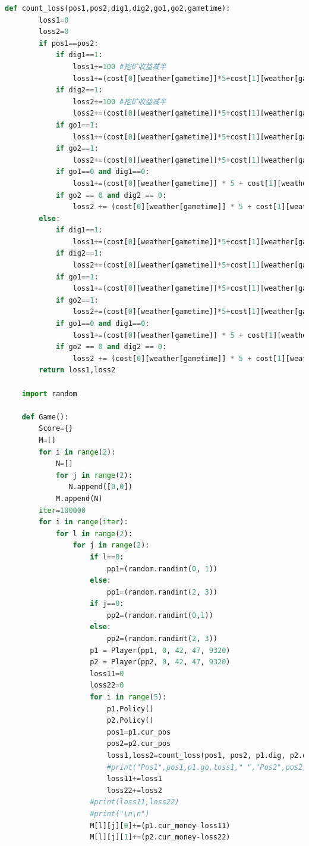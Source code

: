 \documentclass[withoutpreface,bwprint]{cumcmthesis} %
\begin{document}
\begin{appendices}
\begin{lstlisting}[language=python]
    def count_loss(pos1,pos2,dig1,dig2,go1,go2,gametime):
        loss1=0
        loss2=0
        if pos1==pos2:
            if dig1==1:
                loss1+=100 #挖矿收益减半
                loss1+=(cost[0][weather[gametime]]*5+cost[1][weather[gametime]]*10)*3
            if dig2==1:
                loss2+=100 #挖矿收益减半
                loss2+=(cost[0][weather[gametime]]*5+cost[1][weather[gametime]]*10)*3
            if go1==1:
                loss1+=(cost[0][weather[gametime]]*5+cost[1][weather[gametime]]*10)*4
            if go2==1:
                loss2+=(cost[0][weather[gametime]]*5+cost[1][weather[gametime]]*10)*4
            if go1==0 and dig1==0:
                loss1+=(cost[0][weather[gametime]] * 5 + cost[1][weather[gametime]] * 10) * 2
            if go2 == 0 and dig2 == 0:
                loss2 += (cost[0][weather[gametime]] * 5 + cost[1][weather[gametime]] * 10) * 2
        else:
            if dig1==1:
                loss1+=(cost[0][weather[gametime]]*5+cost[1][weather[gametime]]*10)*3
            if dig2==1:
                loss2+=(cost[0][weather[gametime]]*5+cost[1][weather[gametime]]*10)*3
            if go1==1:
                loss1+=(cost[0][weather[gametime]]*5+cost[1][weather[gametime]]*10)*2
            if go2==1:
                loss2+=(cost[0][weather[gametime]]*5+cost[1][weather[gametime]]*10)*2
            if go1==0 and dig1==0:
                loss1+=(cost[0][weather[gametime]] * 5 + cost[1][weather[gametime]] * 10)
            if go2 == 0 and dig2 == 0:
                loss2 += (cost[0][weather[gametime]] * 5 + cost[1][weather[gametime]] * 10)
        return loss1,loss2
    
    import random
    
    def Game():
        Score={}
        M=[]
        for i in range(2):
            N=[]
            for j in range(2):
               N.append([0,0])
            M.append(N)
        iter=100000
        for i in range(iter):
            for l in range(2):
                for j in range(2):
                    if l==0:
                        pp1=(random.randint(0, 1))
                    else:
                        pp1=(random.randint(2, 3))
                    if j==0:
                        pp2=(random.randint(0,1))
                    else:
                        pp2=(random.randint(2, 3))
                    p1 = Player(pp1, 0, 42, 47, 9320)
                    p2 = Player(pp2, 0, 42, 47, 9320)
                    loss11=0
                    loss22=0
                    for i in range(5):
                        p1.Policy()
                        p2.Policy()
                        pos1=p1.cur_pos
                        pos2=p2.cur_pos
                        loss1,loss2=count_loss(pos1, pos2, p1.dig, p2.dig, p1.go, p2.go, i)
                        #print("Pos1",pos1,p1.go,loss1," ","Pos2",pos2,p2.go,loss2)
                        loss11+=loss1
                        loss22+=loss2
                    #print(loss11,loss22)
                    #print("\n\n")
                    M[l][j][0]+=(p1.cur_money-loss11)
                    M[l][j][1]+=(p2.cur_money-loss22)
    

\end{lstlisting}
\end{appendices}
\end{document}

